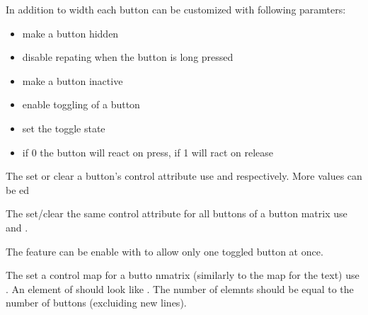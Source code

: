 \documentclass[letterpaper,10pt,english]{sphinxmanual}
\begin{document}
In addition to width each button can be customized with following paramters:
\begin{itemize}
\item {} 
 make a button hidden

\item {} 
 disable repating when the button is long pressed

\item {} 
 make a button inactive

\item {} 
 enable toggling of a button

\item {} 
 set the toggle state

\item {} 
 if 0 the button will react on press, if 1 will ract on release

\end{itemize}

The set or clear a button’s control attribute use  and  respectively. More  values can be ed

The set/clear the same control attribute for all buttons of a button matrix use  and .

The  feature can be enable with  to allow only one toggled button at once.

The set a control map for a butto nmatrix (similarly to the map for the text) use .
An element of  should look like . The number of elemnts should be equal to the number of buttons (excluiding new lines).
\end{document}
